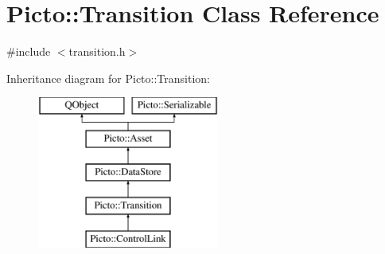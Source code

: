\hypertarget{class_picto_1_1_transition}{\section{Picto\-:\-:Transition Class Reference}
\label{class_picto_1_1_transition}
}


{\ttfamily \#include $<$transition.\-h$>$}

Inheritance diagram for Picto\-:\-:Transition\-:\begin{figure}[H]
\begin{center}
\leavevmode
\includegraphics[height=5.000000cm]{class_picto_1_1_transition}
\end{center}
\end{figure}
